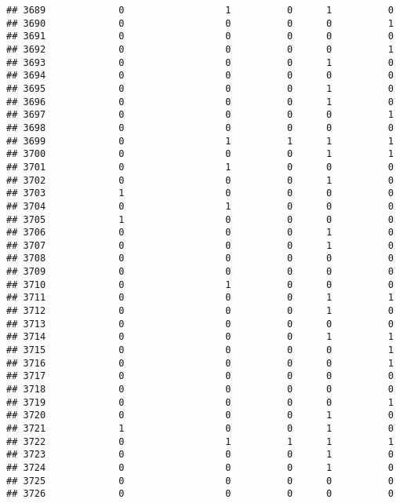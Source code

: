 \documentclass[
]{article}
\begin{document}
\begin{verbatim}
## 3689             0                  1          0      1          0
## 3690             0                  0          0      0          1
## 3691             0                  0          0      0          0
## 3692             0                  0          0      0          1
## 3693             0                  0          0      1          0
## 3694             0                  0          0      0          0
## 3695             0                  0          0      1          0
## 3696             0                  0          0      1          0
## 3697             0                  0          0      0          1
## 3698             0                  0          0      0          0
## 3699             0                  1          1      1          1
## 3700             0                  0          0      1          1
## 3701             0                  1          0      0          0
## 3702             0                  0          0      1          0
## 3703             1                  0          0      0          0
## 3704             0                  1          0      0          0
## 3705             1                  0          0      0          0
## 3706             0                  0          0      1          0
## 3707             0                  0          0      1          0
## 3708             0                  0          0      0          0
## 3709             0                  0          0      0          0
## 3710             0                  1          0      0          0
## 3711             0                  0          0      1          1
## 3712             0                  0          0      1          0
## 3713             0                  0          0      0          0
## 3714             0                  0          0      1          1
## 3715             0                  0          0      0          1
## 3716             0                  0          0      0          1
## 3717             0                  0          0      0          0
## 3718             0                  0          0      0          0
## 3719             0                  0          0      0          1
## 3720             0                  0          0      1          0
## 3721             1                  0          0      1          0
## 3722             0                  1          1      1          1
## 3723             0                  0          0      1          0
## 3724             0                  0          0      1          0
## 3725             0                  0          0      0          0
## 3726             0                  0          0      0          0

\end{verbatim}
\end{document}
